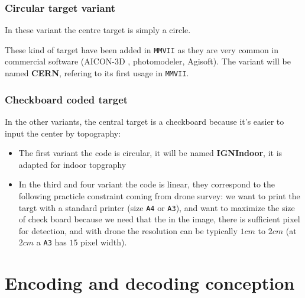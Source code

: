 \subsubsection{Circular target variant}

In these variant the centre target is simply a circle.  


These kind of target have been added in {\tt MMVII} as they are very common in commercial
software (AICON-3D , photomodeler, Agisoft). The variant will be named {\bf CERN}, refering to
its first usage in {\tt MMVII}.


\subsubsection{Checkboard coded target}

In the other variants, the central target is a checkboard because it's  easier to input the center
by topography: 


\begin{itemize}
     \item  The first variant the code is circular, it will be named {\bf IGNIndoor},
	     it is adapted for indoor topgraphy

     \item  In the third and four variant the code is linear, they correspond to the following
	     practicle constraint coming from drone survey: we want to print the targt with a standard printer
            (size  {\tt A4} or {\tt  A3}),  and want to maximize the size of check board because
            we need that the in the image, there is sufficient pixel for detection, and with drone the
		resolution can be typically $1cm$ to $2cm$ (at $2cm$  a {\tt A3} has $15$ pixel width).
\end{itemize}


\section{Encoding and decoding conception}



